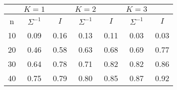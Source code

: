 \begin{table}[ht]
\centering
\begin{tabular}{c|cc|cc|cc}
 &   $K=1$ &    & $K=2$ &    & $K=3$ &  \\ 
  \hline
n & $\Sigma^{-1}$ &  $I$ & $\Sigma^{-1}$ &  $I$ & $\Sigma^{-1}$ &  $I$ \\
  \hline10&0.09&0.16&0.13&0.11&0.03&0.03\\20&0.46&0.58&0.63&0.68&0.69&0.77\\30&0.64&0.78&0.71&0.82&0.82&0.86\\40&0.75&0.79&0.80&0.85&0.87&0.92\\\hline
\end{tabular}
\end{table}
